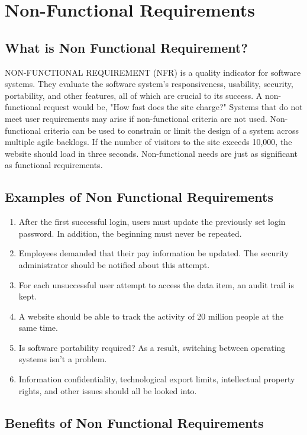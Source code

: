 \section{Non-Functional Requirements}
\subsection{What is Non Functional Requirement?}
NON-FUNCTIONAL REQUIREMENT (NFR) is a quality indicator for software systems. They evaluate the software system's responsiveness, usability, security, portability, and other features, all of which are crucial to its success. A non-functional request would be, "How fast does the site charge?" Systems that do not meet user requirements may arise if non-functional criteria are not used.
Non-functional criteria can be used to constrain or limit the design of a system across multiple agile backlogs. If the number of visitors to the site exceeds 10,000, the website should load in three seconds. Non-functional needs are just as significant as functional requirements.

\subsection{Examples of Non Functional Requirements}
\begin{enumerate}
\item After the first successful login, users must update the previously set login password. In addition, the beginning must never be repeated.
\item Employees demanded that their pay information be updated. The security administrator should be notified about this attempt.
\item For each unsuccessful user attempt to access the data item, an audit trail is kept.
\item A website should be able to track the activity of 20 million people at the same time.
\item  Is software portability required? As a result, switching between operating systems isn't a problem.
\item Information confidentiality, technological export limits, intellectual property rights, and other issues should all be looked into.
\end{enumerate}

\subsection{Benefits of Non Functional Requirements}


